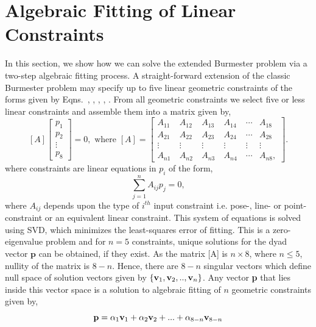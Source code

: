\section{Algebraic Fitting of Linear Constraints}\label{algebraicFitting}
In this section, we show how we can solve the extended Burmester problem via a two-step algebraic fitting process. A straight-forward extension of the classic Burmester problem may specify up to five linear geometric constraints of the forms given by Eqns.~, , , , .
From all geometric constraints we select five or less linear constraints and assemble them into a matrix given by,
\begin{equation}\label{A8}
[A] \left[\begin{array}{r}
p_1\\
p_2\\
\vdots \\
p_8
\end{array}\right]=0,   \mbox{    where   }[A]=
 \left[
\begin{array}{cccccccc}
 A_{11}\ & A_{12}\ & A_{13}\ & A_{14}\ & \cdots & A_{18} \\
 A_{21}\ & A_{22}\ & A_{23}\ & A_{24}\ & \cdots & A_{28} \\
 \vdots &  \vdots &  \vdots &  \vdots &  \vdots &  \vdots \\
 A_{n1}\ & A_{n2}\ & A_{n3}\ & A_{n4}\ & \cdots & A_{n8},
\end{array}
\right].
\end{equation}
where constraints are linear equations in $p_i$ of the form,
\begin{equation}\label{inputLinearEquation}
 \sum_{j=1}^{n}A_{ij}p_j=0,
\end{equation}
where $A_{ij}$ depends upon the type of $i^{th}$ input constraint i.e. pose-, line- or point-constraint or an equivalent linear constraint. This system of equations is solved using SVD, which minimizes the least-squares error of fitting. This is a zero-eigenvalue problem and for $n=5$ constraints, unique solutions for the dyad vector $\textbf{p}$ can be obtained, if they exist. As the matrix [A] is $n\times8$, where $n \leq 5$, nullity of the matrix is $8-n$. Hence, there are $8-n$ singular vectors which define null space of solution vectors given by $\{{\bf v}_1,{\bf v}_2,..,{\bf v}_n\}$. Any vector {\bf p} that lies inside this vector space is a solution to algebraic fitting of $n$ geometric constraints given by,
\begin{equation}\label{solutionSpace}
{\bf p} = \alpha_1 {\bf v}_1+\alpha_2 {\bf v}_2+...+\alpha_{8-n}{\bf v}_{8-n}
\end{equation}
